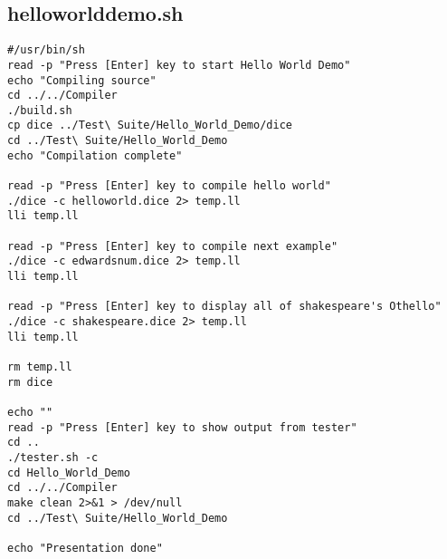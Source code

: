 \subsection{helloworlddemo.sh}
\begin{verbatim}
#/usr/bin/sh
read -p "Press [Enter] key to start Hello World Demo"
echo "Compiling source"
cd ../../Compiler
./build.sh
cp dice ../Test\ Suite/Hello_World_Demo/dice
cd ../Test\ Suite/Hello_World_Demo
echo "Compilation complete"

read -p "Press [Enter] key to compile hello world"
./dice -c helloworld.dice 2> temp.ll
lli temp.ll

read -p "Press [Enter] key to compile next example"
./dice -c edwardsnum.dice 2> temp.ll
lli temp.ll

read -p "Press [Enter] key to display all of shakespeare's Othello"
./dice -c shakespeare.dice 2> temp.ll
lli temp.ll

rm temp.ll
rm dice

echo ""
read -p "Press [Enter] key to show output from tester"
cd ..
./tester.sh -c
cd Hello_World_Demo
cd ../../Compiler
make clean 2>&1 > /dev/null
cd ../Test\ Suite/Hello_World_Demo

echo "Presentation done"
\end{verbatim}